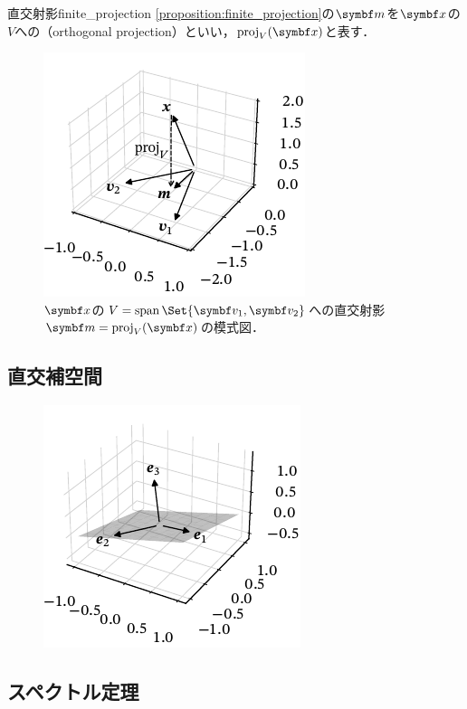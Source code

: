 \documentclass[../../main]{subfiles}
\begin{document}
\begin{definition}{直交射影}{finite_projection}
  \cref{proposition:finite_projection}の\(\vect{m}\)を\(\vect{x}\)の\(V\)への（orthogonal projection）といい，\(\proj_V(\vect{x})\)と表す．
\end{definition}

\begin{figure}[htbp]
  \centering
  \includegraphics{projection.pdf}
  \caption{\(\vect{x}\)の\(V=\spannedby\Set{\vect{v}_1,\vect{v}_2}\)への直交射影\(\vect{m}=\proj_V(\vect{x})\)の模式図．}
\end{figure}

\subsection{直交補空間}
\begin{figure}[htbp]
  \centering
  \includegraphics{orthogonal_complement.pdf}
\end{figure}

\subsection{スペクトル定理}
\end{document}
